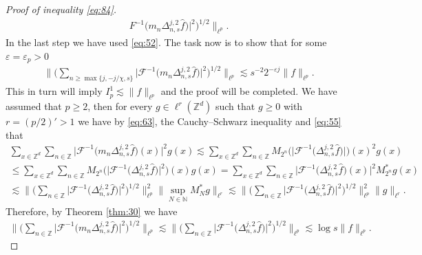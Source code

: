 \documentclass[a4paper,oneside]{amsart}
\theoremstyle{plain}
\theoremstyle{definition}
\numberwithin{equation}{section}
\newcounter{thm}
\theoremstyle{plain}
\newcommand{\ZZ}{\mathbb{Z}}
\newcommand{\NN}{\mathbb{N}}
\newcommand{\8}{\infty}
\begin{document}
\begin{proof}[Proof of inequality \eqref{eq:84}]
\begin{multline}
  F^{-1}\big(m_n\Delta_{n, s}^{j, 2}\hat{f}\big)\big|^2\Big)^{1/2}\bigg\|_{\ell^p}.
\end{multline}
In the last step we have used \eqref{eq:52}.
The task now is to show that for some $\varepsilon=\varepsilon_p>0$ 
\begin{align}
  \label{eq:73}
  \bigg\|\Big(\sum_{n\ge\max\{j,-j/\chi, s\}}\big|\mathcal
  F^{-1}\big(m_n\Delta_{n, s}^{j,
    2}\hat{f}\big)\big|^2\Big)^{1/2}\bigg\|_{\ell^p}
\lesssim
  s^{-2}2^{-\varepsilon j}\|f\|_{\ell^p}.
\end{align}
This in turn will imply $I_p^1\lesssim \|f\|_{\ell^p}$ and the proof
will be completed. We have assumed that $p\ge 2$, then for
every $g\in\ell^r(\ZZ^d)$ such that $g\ge 0$ with $r=(p/2)'>1$ we have
by  \eqref{eq:63}, the Cauchy--Schwarz inequality and \eqref{eq:55} that 
\begin{multline}
  \label{eq:40}
  \sum_{x\in\ZZ^d}\sum_{n\in\ZZ}\big|\mathcal
  F^{-1}\big(m_n\Delta_{n, s}^{j,
    2}\hat{f}\big)(x)\big|^2g(x)
\lesssim \sum_{x\in\ZZ^d}\sum_{n\in\ZZ}M_{2^n}\big(\big|\mathcal
  F^{-1}\big(\Delta_{n, s}^{j,
    2}\hat{f}\big)\big|\big)(x)^2g(x)\\
\le \sum_{x\in\ZZ^d}\sum_{n\in\ZZ}M_{2^n}\big(\big|\mathcal
  F^{-1}\big(\Delta_{n, s}^{j,
    2}\hat{f}\big)\big|^2\big)(x)g(x)=
\sum_{x\in\ZZ^d}\sum_{n\in\ZZ}\big|\mathcal
  F^{-1}\big(\Delta_{n, s}^{j,
    2}\hat{f}\big)(x)\big|^2 M_{2^n}^*g(x)\\
\lesssim
\bigg\|\Big(\sum_{n\in\ZZ}\big|\mathcal
  F^{-1}\big(\Delta_{n, s}^{j,
    2}\hat{f}\big)\big|^2\Big)^{1/2}\bigg\|_{\ell^p}^2
 \big\|\sup_{N\in\NN} M_N^*g\big\|_{\ell^r}
\lesssim
\bigg\|\Big(\sum_{n\in\ZZ}\big|\mathcal
  F^{-1}\big(\Delta_{n, s}^{j,
    2}\hat{f}\big)\big|^2\Big)^{1/2}\bigg\|_{\ell^{p}}^2
 \|g\|_{\ell^r}.
\end{multline}
Therefore, by Theorem \ref{thm:30} we have
\begin{align}
  \label{eq:43}
\bigg\|\Big(\sum_{n\in\ZZ}\big|\mathcal
  F^{-1}\big(m_n\Delta_{n, s}^{j,
    2}\hat{f}\big)\big|^2\Big)^{1/2}\bigg\|_{\ell^p}
\lesssim
\bigg\|\Big(\sum_{n\in\ZZ}\big|\mathcal
  F^{-1}\big(\Delta_{n, s}^{j,
    2}\hat{f}\big)\big|^2\Big)^{1/2}\bigg\|_{\ell^p}\lesssim \log s\|f\|_{\ell^p}.  
\end{align}


\end{proof}
\end{document}
